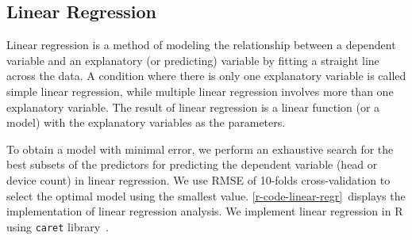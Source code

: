 	\subsection{Linear Regression} %
	\label{sub:linear_estimator}
	Linear regression is a method of modeling the relationship between a dependent variable and an explanatory (or predicting) variable by fitting a straight line across the data. A condition where there is only one explanatory variable is called simple linear regression, while multiple linear regression involves more than one explanatory variable. The result of linear regression is a linear function (or a model) with the explanatory variables as the parameters.

	To obtain a model with minimal error, we perform an exhaustive search for the best subsets of the predictors for predicting the dependent variable (head or device count) in linear regression. We use \ac{RMSE} of 10-folds cross-validation to select the optimal model using the smallest value. \autoref{r-code-linear-regr}~displays the implementation of linear regression analysis. We implement linear regression in R using \verb|caret| library~\cite{caret}. 
	
